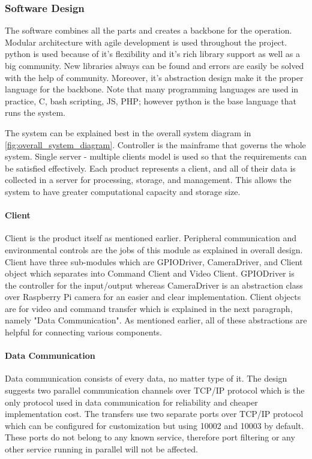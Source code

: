 \subsubsection{Software Design}
The software combines all the parts and creates a backbone for the operation. Modular architecture with agile development is used throughout the project. python is used because of it's flexibility and it's rich library support as well as a big community. New libraries always can be found and errors are easily be solved with the help of community. Moreover, it's abstraction design make it the proper language for the backbone. Note that many programming languages are used in practice, C, bash scripting, JS, PHP; however python is the base language that runs the system.

The system can be explained best in the overall system diagram in \ref{fig:overall_system_diagram}. Controller is the mainframe that governs the whole system. Single server - multiple clients model is used so that the requirements can be satisfied effectively. Each product represents a client, and all of their data is collected in a server for processing, storage, and management. This allows the system to have greater computational capacity and storage size.

\paragraph{Client}
Client is the product itself as mentioned earlier. Peripheral communication and environmental controls are the jobs of this module as explained in overall design. Client have three sub-modules which are GPIODriver, CameraDriver, and Client object which separates into Command Client and Video Client. GPIODriver is the controller for the input/output whereas CameraDriver is an abstraction class over Raspberry Pi camera for an easier and clear implementation. Client objects are for video and command transfer which is explained in the next paragraph, namely "Data Communication". As mentioned earlier, all of these abstractions are helpful for connecting various components.


\paragraph{Data Communication}
Data communication consists of every data, no matter type of it. The design suggests two parallel communication channels over TCP/IP protocol which is the only protocol used in data communication for reliability and cheaper implementation cost. The transfers use two separate ports over TCP/IP protocol which can be configured for customization but using 10002 and 10003 by default. These ports do not belong to any known service, therefore port filtering or any other service running in parallel will not be affected.

